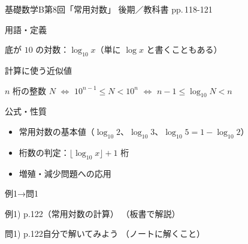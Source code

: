 \documentclass[aspectratio=43,professionalfonts,handout]{beamer}
\newcommand{\LectureNum}{8}
\newcommand{\LectureTitle}{常用対数}
\newcommand{\TextPages}{pp.\,118-121}
\newcommand{\CourseName}{基礎数学B}
\renewcommand{\TermName}{後期}
\begin{document}
\begin{frame}{\CourseName\quad 第\LectureNum 回「\LectureTitle 」}
  {\small \TermName\quad \TeacherName\quad ／\quad 教科書 \TextPages}

  \begin{block}{用語・定義}
  \begin{description}[labelwidth=5.5em]
    \item[\kw{常用対数：底が10の対数（$\log_{10}$）}] 底が $10$ の対数：$\log_{10} x$（単に $\log x$ と書くこともある）
    \item[\kw{$\log_{10} 2 \approx 0.3010$、$\log_{10} 3 \approx 0.4771$}] 計算に使う近似値
    \item[\kw{桁数：$n$ 桁 $\Leftrightarrow$ $10^{n-1} \leq N < 10^n$}] $n$ 桁の整数 $N$ $\Leftrightarrow$ $10^{n-1} \leq N < 10^n$ $\Leftrightarrow$ $n-1 \leq \log_{10} N < n$
  \end{description}
  \end{block}
\end{frame}

\begin{frame}{公式・性質}
  \begin{block}{}
  \begin{itemize}
    \item 常用対数の基本値（$\log_{10} 2$、$\log_{10} 3$、$\log_{10} 5 = 1 - \log_{10} 2$）
    \item 桁数の判定：$\lfloor \log_{10} x \rfloor + 1$ 桁
    \item 増殖・減少問題への応用
  \end{itemize}
  \end{block}
\end{frame}

\begin{frame}{例1→問1}
  \begin{exampleblock}{例1) p.122（常用対数の計算）}
    （板書で解説）
  \end{exampleblock}

  \vfill

  \begin{block}{問1) p.122\quad 自分で解いてみよう}
    （ノートに解くこと）
  \end{block}
\end{frame}
\end{document}
